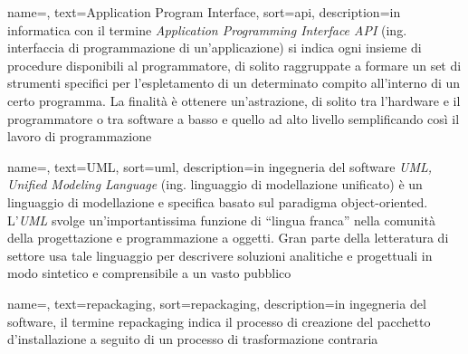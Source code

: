 
\renewcommand{\acronymname}{Acronimi e abbreviazioni}






%
%


{
    name=,
    text=Application Program Interface,
    sort=api,
    description={in informatica con il termine \emph{Application Programming Interface API} (ing. interfaccia di programmazione di un'applicazione) si indica ogni insieme di procedure disponibili al programmatore, di solito raggruppate a formare un set di strumenti specifici per l'espletamento di un determinato compito all'interno di un certo programma. La finalità è ottenere un'astrazione, di solito tra l'hardware e il programmatore o tra software a basso e quello ad alto livello semplificando così il lavoro di programmazione}
}

{
    name=,
    text=UML,
    sort=uml,
    description={in ingegneria del software \emph{UML, Unified Modeling Language} (ing. linguaggio di modellazione unificato) è un linguaggio di modellazione e specifica basato sul paradigma object-oriented. L'\emph{UML} svolge un'importantissima funzione di ``lingua franca'' nella comunità della progettazione e programmazione a oggetti. Gran parte della letteratura di settore usa tale linguaggio per descrivere soluzioni analitiche e progettuali in modo sintetico e comprensibile a un vasto pubblico}
}

{
    name=,
    text=repackaging,
    sort=repackaging,
    description={in ingegneria del software, il termine repackaging indica il processo di creazione del pacchetto d'installazione a seguito di un processo di trasformazione contraria}
}

